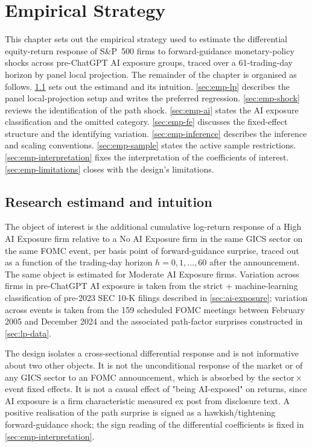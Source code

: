 \chapter{Empirical Strategy}
\label{ch:empirics}

This chapter sets out the empirical strategy used to estimate the differential equity-return response of S\&P~500 firms to forward-guidance monetary-policy shocks across pre-ChatGPT AI exposure groups, traced over a 61-trading-day horizon by panel local projection. The remainder of the chapter is organised as follows. \cref{sec:emp-estimand} sets out the estimand and its intuition. \cref{sec:emp-lp} describes the panel local-projection setup and writes the preferred regression. \cref{sec:emp-shock} reviews the identification of the path shock. \cref{sec:emp-ai} states the AI exposure classification and the omitted category. \cref{sec:emp-fe} discusses the fixed-effect structure and the identifying variation. \cref{sec:emp-inference} describes the inference and scaling conventions. \cref{sec:emp-sample} states the active sample restrictions. \cref{sec:emp-interpretation} fixes the interpretation of the coefficients of interest. \cref{sec:emp-limitations} closes with the design's limitations.

\section{Research estimand and intuition}
\label{sec:emp-estimand}

The object of interest is the additional cumulative log-return response of a High AI Exposure firm relative to a No AI Exposure firm in the same GICS sector on the same FOMC event, per basis point of forward-guidance surprise, traced out as a function of the trading-day horizon $h = 0, 1, \dots, 60$ after the announcement. The same object is estimated for Moderate AI Exposure firms. Variation across firms in pre-ChatGPT AI exposure is taken from the strict + machine-learning classification of pre-2023 SEC 10-K filings described in \cref{sec:ai-exposure}; variation across events is taken from the 159 scheduled FOMC meetings between February 2005 and December 2024 and the associated path-factor surprises constructed in \cref{sec:lp-data}.

The design isolates a cross-sectional differential response and is not informative about two other objects. It is not the unconditional response of the market or of any GICS sector to an FOMC announcement, which is absorbed by the sector\,$\times$\,event fixed effects. It is not a causal effect of "being AI-exposed" on returns, since AI exposure is a firm characteristic measured ex post from disclosure text. A positive realisation of the path surprise is signed as a hawkish/tightening forward-guidance shock; the sign reading of the differential coefficients is fixed in \cref{sec:emp-interpretation}.

